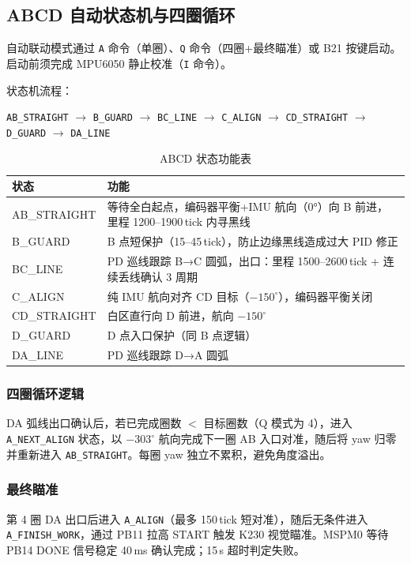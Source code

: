 \documentclass[12pt,a4paper]{ctexart}
\begin{document}
\subsection{ABCD 自动状态机与四圈循环}
自动联动模式通过 \texttt{A} 命令（单圈）、\texttt{Q} 命令（四圈+最终瞄准）或 B21 按键启动。启动前须完成 MPU6050 静止校准（\texttt{I} 命令）。

状态机流程：
\begin{center}
\texttt{AB\_STRAIGHT} $\rightarrow$ \texttt{B\_GUARD} $\rightarrow$ \texttt{BC\_LINE} $\rightarrow$ \texttt{C\_ALIGN} $\rightarrow$ \texttt{CD\_STRAIGHT} $\rightarrow$ \texttt{D\_GUARD} $\rightarrow$ \texttt{DA\_LINE}
\end{center}

\begin{table}[H]
\centering
\caption{ABCD 状态功能表}
\begin{tabular}{@{}lp{9cm}@{}}
\toprule
\textbf{状态} & \textbf{功能} \\
\midrule
AB\_STRAIGHT & 等待全白起点，编码器平衡+IMU 航向（0°）向 B 前进，里程 1200--1900\,tick 内寻黑线 \\
B\_GUARD     & B 点短保护（15--45\,tick），防止边缘黑线造成过大 PID 修正 \\
BC\_LINE      & PD 巡线跟踪 B→C 圆弧，出口：里程 1500--2600\,tick + 连续丢线确认 3 周期 \\
C\_ALIGN      & 纯 IMU 航向对齐 CD 目标（$-150^\circ$），编码器平衡关闭 \\
CD\_STRAIGHT  & 白区直行向 D 前进，航向 $-150^\circ$ \\
D\_GUARD      & D 点入口保护（同 B 点逻辑） \\
DA\_LINE      & PD 巡线跟踪 D→A 圆弧 \\
\bottomrule
\end{tabular}
\end{table}

\subsubsection*{四圈循环逻辑}
DA 弧线出口确认后，若已完成圈数 $<$ 目标圈数（Q 模式为 4），进入 \texttt{A\_NEXT\_ALIGN} 状态，以 $-303^\circ$ 航向完成下一圈 AB 入口对准，随后将 yaw 归零并重新进入 \texttt{AB\_STRAIGHT}。每圈 yaw 独立不累积，避免角度溢出。

\subsubsection*{最终瞄准}
第 4 圈 DA 出口后进入 \texttt{A\_ALIGN}（最多 150\,tick 短对准），随后无条件进入 \texttt{A\_FINISH\_WORK}，通过 PB11 拉高 START 触发 K230 视觉瞄准。MSPM0 等待 PB14 DONE 信号稳定 40\,ms 确认完成；15\,s 超时判定失败。
\end{document}
